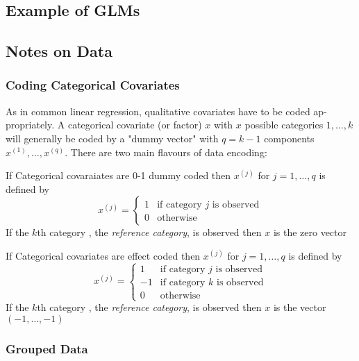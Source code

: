 \newpage
\subsection{Example of GLMs}
    

\newpage
\subsection{Notes on Data}


\subsubsection*{Coding Categorical Covariates}

As in common linear regression, qualitative covariates have to be coded ap- propriately. A categorical covariate (or factor) $x$ with $x$ possible categories $1,\dots,k$ will generally be coded by a "dummy vector" with $q = k - 1$ components $x^{(1)},\dots,x^{(q)}$. There are two main flavours of data encoding:

\begin{definition}
    If Categorical covaraiates are 0-1 dummy coded then $x^{(j)}$ for $j=1,\dots,q$ is defined by
    \[ x^{(j)} = \begin{cases} 
      1 & \text{if category $j$ is observed} \\
      0 & \text{otherwise}
   \end{cases}
    \]
    If the $k$th category , the \textit{reference category}, is observed then $x$ is the zero vector
\end{definition}

\begin{definition}
    If Categorical covariates are effect coded then $x^{(j)}$ for $j=1,\dots,q$ is defined by
    \[ x^{(j)} = \begin{cases} 
      1 & \text{if category $j$ is observed} \\
      -1 & \text{if category $k$ is observed} \\
      0 & \text{otherwise}
    \end{cases}
    \]
    If the $k$th category , the \textit{reference category}, is observed then $x$ is the vector $(-1,\dots,-1)$
\end{definition}

\subsubsection*{Grouped Data}